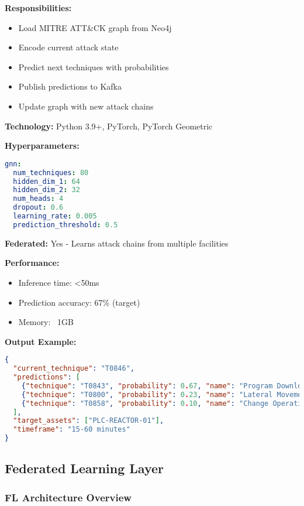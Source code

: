 \documentclass[12pt,a4paper]{article}
\begin{document}
\textbf{Responsibilities:}
\begin{itemize}[leftmargin=1cm,itemsep=0pt]
    \item Load MITRE ATT\&CK graph from Neo4j
    \item Encode current attack state
    \item Predict next techniques with probabilities
    \item Publish predictions to Kafka
    \item Update graph with new attack chains
\end{itemize}

\textbf{Technology:} Python 3.9+, PyTorch, PyTorch Geometric

\textbf{Hyperparameters:}
\begin{lstlisting}[language=yaml]
gnn:
  num_techniques: 80
  hidden_dim_1: 64
  hidden_dim_2: 32
  num_heads: 4
  dropout: 0.6
  learning_rate: 0.005
  prediction_threshold: 0.5
\end{lstlisting}

\textbf{Federated:} Yes - Learns attack chains from multiple facilities

\textbf{Performance:}
\begin{itemize}[leftmargin=1cm,itemsep=0pt]
    \item Inference time: <50ms
    \item Prediction accuracy: 67\% (target)
    \item Memory: ~1GB
\end{itemize}

\textbf{Output Example:}
\begin{lstlisting}[language=json]
{
  "current_technique": "T0846",
  "predictions": [
    {"technique": "T0843", "probability": 0.67, "name": "Program Download"},
    {"technique": "T0800", "probability": 0.23, "name": "Lateral Movement"},
    {"technique": "T0858", "probability": 0.10, "name": "Change Operating Mode"}
  ],
  "target_assets": ["PLC-REACTOR-01"],
  "timeframe": "15-60 minutes"
}
\end{lstlisting}

\subsection{Federated Learning Layer}

\subsubsection{FL Architecture Overview}
\end{document}
